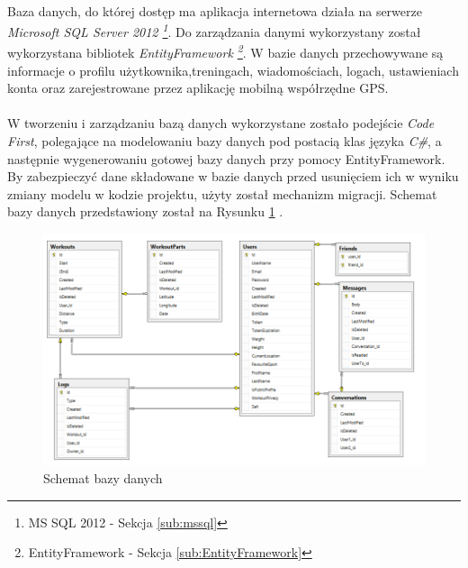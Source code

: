 \paragraph{} %
\label{par:}
Baza danych, do której dostęp ma aplikacja internetowa działa na serwerze \textit{Microsoft SQL Server 2012 \footnote{MS SQL 2012 - Sekcja \ref{sub:mssql}}}. Do zarządzania danymi wykorzystany został wykorzystana bibliotek \textit{EntityFramework \footnote{EntityFramework - Sekcja \ref{sub:EntityFramework}}}. W bazie danych przechowywane są informacje o profilu użytkownika,treningach, wiadomościach, logach, ustawieniach konta oraz zarejestrowane przez aplikację mobilną współrzędne GPS.

\paragraph{} %
\label{par:}
W tworzeniu i zarządzaniu bazą danych wykorzystane zostało podejście \textit{Code First}, polegające na modelowaniu bazy danych pod postacią klas języka \textit{C\#}, a następnie wygenerowaniu gotowej bazy danych przy pomocy EntityFramework. By zabezpieczyć dane składowane w bazie danych przed usunięciem ich w wyniku zmiany modelu w kodzie projektu, użyty został mechanizm migracji. 
Schemat bazy danych przedstawiony został na Rysunku \ref{fig:database} .


\label{sub:schemat_bazy_danych}
\begin{figure}[ht]
	\centering
		\includegraphics[width=1\linewidth]{assets/database.png}
	\caption{Schemat bazy danych}
	\label{fig:database}
\end{figure}


\newpage
